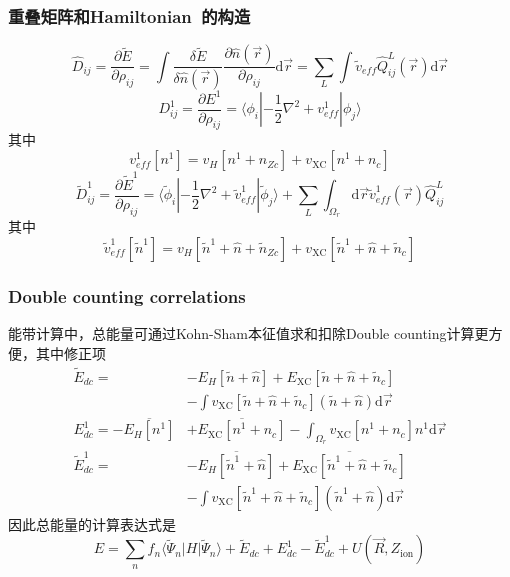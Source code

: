 \frame
{
	\frametitle{重叠矩阵和\textrm{Hamiltonian~}的构造}
	$$\hat D_{ij}=\dfrac{\partial\tilde E}{\partial\rho_{ij}}=\int\dfrac{\delta\tilde E}{\delta\hat n(\vec  r)}\dfrac{\partial\hat n(\vec r)}{\partial\rho_{ij}}\mathrm{d}\vec r=\sum_{L}\int\tilde v_{e\!f\!f}\hat Q_{ij}^L(\vec r)\mathrm{d}\vec r$$
	$$D_{ij}^1=\dfrac{\partial E^1}{\partial\rho_{ij}}=\langle\phi_i|-\dfrac12\nabla^2+v_{e\!f\!f}^1|\phi_j\rangle$$
	其中$$v_{e\!f\!f}^1[n^1]=v_H[n^1+n_{Zc}]+v_{\mathrm{XC}}[n^1+n_c]$$
	$$\tilde D_{ij}^1=\dfrac{\partial\tilde E^1}{\partial\rho_{ij}}=\langle\tilde\phi_i|-\dfrac12\nabla^2+\tilde v_{e\!f\!f}^1|\tilde\phi_j\rangle+\sum_L\int_{\Omega_r}\mathrm{d}\vec r\tilde v_{e\!f\!f}^1(\vec r)\hat Q_{ij}^L$$
	其中$$\tilde v_{e\!f\!f}^1[\tilde n^1]=v_H[\tilde n^1+\hat n+\tilde n_{Zc}]+v_{\mathrm{XC}}[\tilde n^1+\hat n+\tilde n_c]$$
}

\frame
{
	\frametitle{\textrm{Double counting correlations}}
	能带计算中，总能量可通过\textrm{Kohn-Sham}本征值求和扣除\textrm{Double counting}计算更方便，其中修正项
	\begin{displaymath}
		\begin{aligned}
			\tilde E_{dc}=&-E_H[\tilde n+\hat n]+E_{\mathrm{XC}}[\tilde n+\hat n+\tilde n_c]\\
			&-\int v_{\mathrm{XC}}[\tilde n+\hat n+\tilde n_c](\tilde n+\hat n)\mathrm{d}\vec r\\
			E_{dc}^1=-\overline{E_H[n^1]}&+\overline{E_{\mathrm{XC}}[n^1+n_c]}-\int_{\Omega_r}v_{\mathrm{XC}}[n^1+n_c]n^1\mathrm{d}\vec r\\
			\tilde E_{dc}^1=&-\overline{E_H[\tilde n^1+\hat n]}+\overline{E_{\mathrm{XC}}[\tilde n^1+\hat n+\tilde n_c]}\\
			&-\int v_{\mathrm{XC}}[\tilde n^1+\hat n+\tilde n_c](\tilde n^1+\hat n)\mathrm{d}\vec r
		\end{aligned}
	\end{displaymath}
	因此总能量的计算表达式是
	$$E=\sum_nf_n\langle\tilde\Psi_n|H|\tilde\Psi_n\rangle+\tilde E_{dc}+E_{dc}^1-\tilde E_{dc}^1+U(\vec R,Z_{\mathrm{ion}})$$
}

